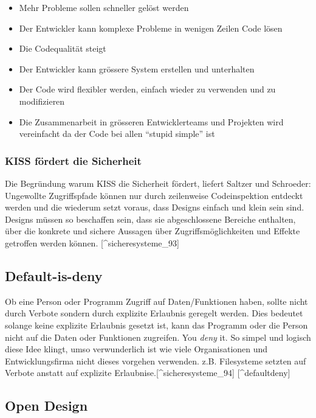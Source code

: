 \begin{itemize}
\tightlist
\item
  Mehr Probleme sollen schneller gelöst werden
\item
  Der Entwickler kann komplexe Probleme in wenigen Zeilen Code lösen
\item
  Die Codequalität steigt
\item
  Der Entwickler kann grössere System erstellen und unterhalten
\item
  Der Code wird flexibler werden, einfach wieder zu verwenden und zu
  modifizieren
\item
  Die Zusammenarbeit in grösseren Entwicklerteams und Projekten wird
  vereinfacht da der Code bei allen ``stupid simple'' ist
\end{itemize}

\subsubsection{KISS fördert die
Sicherheit}\label{kiss-fuxf6rdert-die-sicherheit}

Die Begründung warum KISS die Sicherheit fördert, liefert Saltzer und
Schroeder: Ungewollte Zugriffspfade können nur durch zeilenweise
Codeinspektion entdeckt werden und die wiederum setzt voraus, dass
Designs einfach und klein sein sind. Designs müssen so beschaffen sein,
dass sie abgeschlossene Bereiche enthalten, über die konkrete und
sichere Aussagen über Zugriffsmöglichkeiten und Effekte getroffen werden
können. {[}\^{}sicheresysteme\_93{]}

\subsection{Default-is-deny}\label{default-is-deny}

Ob eine Person oder Programm Zugriff auf Daten/Funktionen haben, sollte
nicht durch Verbote sondern durch explizite Erlaubnis geregelt werden.
Dies bedeutet solange keine explizite Erlaubnis gesetzt ist, kann das
Programm oder die Person nicht auf die Daten oder Funktionen zugreifen.
You \emph{deny} it. So simpel und logisch diese Idee klingt, umso
verwunderlich ist wie viele Organisationen und Entwicklungsfirma nicht
dieses vorgehen verwenden. z.B. Filesysteme setzten auf Verbote anstatt
auf explizite Erlaubnise.{[}\^{}sicheresysteme\_94{]}
{[}\^{}defaultdeny{]}

\subsection{Open Design}\label{open-design}

